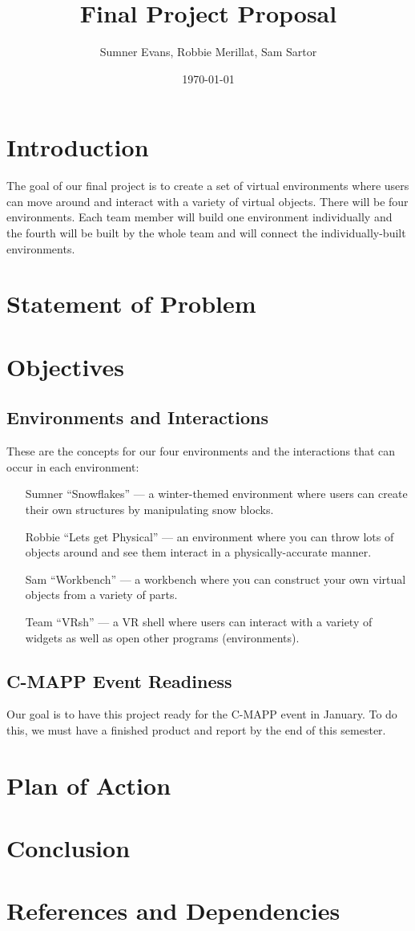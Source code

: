 \documentclass[titlepage,12pt]{article}
\title{Final Project Proposal}
\author{Sumner Evans, Robbie Merillat, Sam Sartor}
\date{\today}
\begin{document}
\maketitle

\section{Introduction}

The goal of our final project is to create a set of virtual environments where
users can move around and interact with a variety of virtual objects. There will
be four environments. Each team member will build one environment individually
and the fourth will be built by the whole team and will connect the
individually-built environments.

\section{Statement of Problem}

\section{Objectives}

\subsection{Environments and Interactions}
These are the concepts for our four environments and the interactions that can
occur in each environment:

\begin{enumerate}[leftmargin=*]
    \item [Sumner] ``Snowflakes'' --- a winter-themed environment where users
        can create their own structures by manipulating snow blocks.
    \item [Robbie] ``Lets get Physical'' --- an environment where you can throw
        lots of objects around and see them interact in a physically-accurate
        manner.
    \item [Sam] ``Workbench'' --- a workbench where you can construct your own
        virtual objects from a variety of parts.
    \item [Team] ``VRsh'' --- a VR shell where users can interact with a variety
        of widgets as well as open other programs (environments).
\end{enumerate}

\subsection{C-MAPP Event Readiness}
Our goal is to have this project ready for the C-MAPP event in January. To do
this, we must have a finished product and report by the end of this semester.

\section{Plan of Action}

\section{Conclusion}

\section{References and Dependencies}
\end{document}
